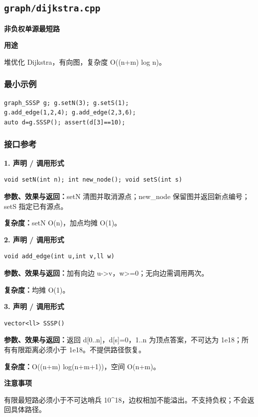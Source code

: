 \documentclass[UTF8,a4paper,10pt]{ctexart}
\newcommand{\TemplUsage}[1]{\textbf{用途}\par #1\par}
\newcommand{\TemplNote}[1]{\textbf{注意事项}\par #1\par}
\begin{document}
\subsection{\texttt{graph/dijkstra.cpp}}
\textbf{非负权单源最短路}\par
\TemplUsage{堆优化 Dijkstra，有向图，复杂度 O((n+m) log n)。}
\subsubsection*{最小示例}
\begin{lstlisting}
graph_SSSP g; g.setN(3); g.setS(1);
g.add_edge(1,2,4); g.add_edge(2,3,6);
auto d=g.SSSP(); assert(d[3]==10);
\end{lstlisting}
\subsubsection*{接口参考}
\noindent\begin{minipage}{\textwidth}
\textbf{1. 声明 / 调用形式}
\begin{lstlisting}
void setN(int n); int new_node(); void setS(int s)
\end{lstlisting}
\textbf{参数、效果与返回：}setN 清图并取消源点；new\_node 保留图并返回新点编号；setS 指定已有源点。

\textbf{复杂度：}setN O(n)，加点均摊 O(1)。

\end{minipage}\par\vspace{0.4em}
\noindent\begin{minipage}{\textwidth}
\textbf{2. 声明 / 调用形式}
\begin{lstlisting}
void add_edge(int u,int v,ll w)
\end{lstlisting}
\textbf{参数、效果与返回：}加有向边 u->v，w>=0；无向边需调用两次。

\textbf{复杂度：}均摊 O(1)。

\end{minipage}\par\vspace{0.4em}
\noindent\begin{minipage}{\textwidth}
\textbf{3. 声明 / 调用形式}
\begin{lstlisting}
vector<ll> SSSP()
\end{lstlisting}
\textbf{参数、效果与返回：}返回 d[0..n]，d[s]=0，1..n 为顶点答案，不可达为 1e18；所有有限距离必须小于 1e18。不提供路径恢复。

\textbf{复杂度：}O((n+m) log(n+m+1))，空间 O(n+m)。

\TemplNote{有限最短路必须小于不可达哨兵 10\textasciicircum{}18，边权相加不能溢出。不支持负权；不会返回具体路径。}
\end{minipage}\par\vspace{0.4em}
\clearpage
\end{document}
